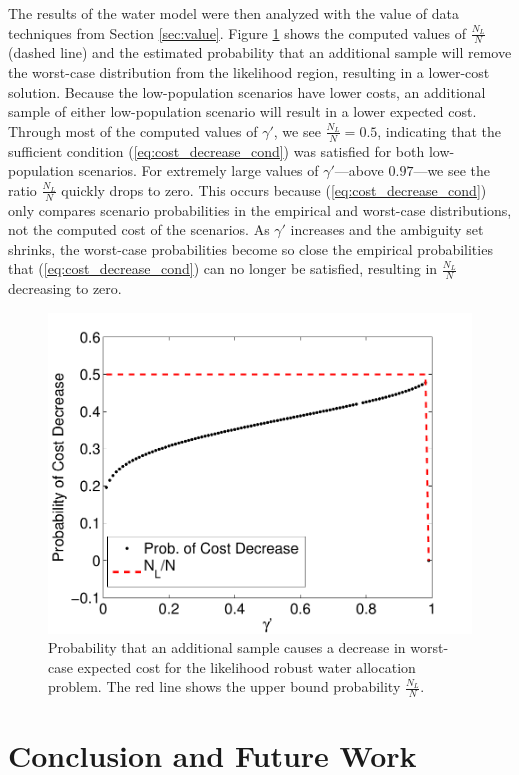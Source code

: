 \documentclass{iserc}
\begin{document}
The results of the water model were then analyzed with the value of data techniques from Section \ref{sec:value}.
Figure \ref{fig:water_prob_decrease} shows the computed values of $\frac{N_L}{N}$ (dashed line) and the estimated probability that an additional sample will remove the worst-case distribution from the likelihood region, resulting in a lower-cost solution. %
Because the low-population scenarios have lower costs, an additional sample of either low-population scenario will result in a lower expected cost.
Through most of the computed values of $\gamma'$, we see $\frac{N_L}{N} = 0.5$, indicating that the sufficient condition (\ref{eq:cost_decrease_cond}) was satisfied for both low-population scenarios.
For extremely large values of $\gamma'$---above $0.97$---we see the ratio $\frac{N_L}{N}$ quickly drops to zero.
This occurs because (\ref{eq:cost_decrease_cond}) only compares scenario probabilities in the empirical and worst-case distributions, not the computed cost of the scenarios.
As $\gamma'$ increases and the ambiguity set shrinks, the worst-case probabilities become so close the empirical probabilities that (\ref{eq:cost_decrease_cond}) can no longer be satisfied, resulting in $\frac{N_L}{N}$ decreasing to zero.

\begin{figure}
	\centering
	\includegraphics[width=.5\textwidth]{images/water_prob_decrease}
	\caption{Probability that an additional sample causes a decrease in worst-case expected cost for the likelihood robust water allocation problem.  The red line shows the upper bound probability $\tfrac{N_L}{N}$.}
	\label{fig:water_prob_decrease}
\end{figure}

\section{Conclusion and Future Work}
\label{sec:concl}
\end{document}
